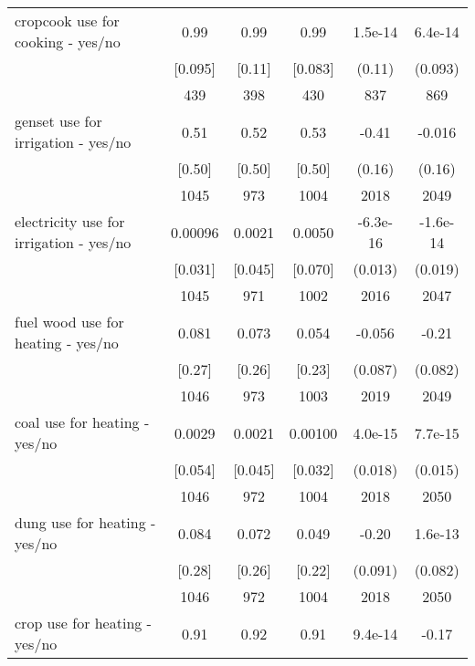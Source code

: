 \begin{table}[htbp]
\begin{tabular*}{0.9\hsize}{@{\hskip\tabcolsep\extracolsep\fill}l*{1}{ccccc}}
cropcook use for cooking  - yes/no&     0.99&     0.99&     0.99&  1.5e-14         &  6.4e-14         \\
                                &  [0.095]&   [0.11]&  [0.083]&   (0.11)         &  (0.093)         \\
                                &      439&      398&      430&      837         &      869         \\
genset use for irrigation  - yes/no&     0.51&     0.52&     0.53&    -0.41\sym{***}&   -0.016         \\
                                &   [0.50]&   [0.50]&   [0.50]&   (0.16)         &   (0.16)         \\
                                &     1045&      973&     1004&     2018         &     2049         \\
electricity use for irrigation  - yes/no&  0.00096&   0.0021&   0.0050& -6.3e-16         & -1.6e-14         \\
                                &  [0.031]&  [0.045]&  [0.070]&  (0.013)         &  (0.019)         \\
                                &     1045&      971&     1002&     2016         &     2047         \\
fuel wood use for heating - yes/no&    0.081&    0.073&    0.054&   -0.056         &    -0.21\sym{***}\\
                                &   [0.27]&   [0.26]&   [0.23]&  (0.087)         &  (0.082)         \\
                                &     1046&      973&     1003&     2019         &     2049         \\
coal use for heating - yes/no   &   0.0029&   0.0021&  0.00100&  4.0e-15         &  7.7e-15         \\
                                &  [0.054]&  [0.045]&  [0.032]&  (0.018)         &  (0.015)         \\
                                &     1046&      972&     1004&     2018         &     2050         \\
dung use for heating - yes/no   &    0.084&    0.072&    0.049&    -0.20\sym{**} &  1.6e-13         \\
                                &   [0.28]&   [0.26]&   [0.22]&  (0.091)         &  (0.082)         \\
                                &     1046&      972&     1004&     2018         &     2050         \\
crop use for heating - yes/no   &     0.91&     0.92&     0.91&  9.4e-14         &    -0.17\sym{*}  \\

\end{tabular*}
\end{table}

